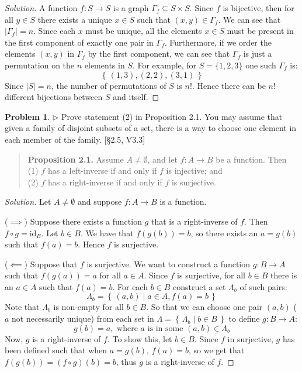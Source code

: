 \documentclass[fontsize=14pt]{scrartcl}
\theoremstyle{definition}
\newtheorem{problem-internal}{Problem}[subsection]
\newenvironment{problem}{
  \medskip
  \begin{problem-internal}
}{
  \end{problem-internal}
}
\newenvironment{solution}{
  \begin{proof}[Solution]
  \vspace{-8px}
  \setlength{\parskip}{4px}
  \setlength{\parindent}{0px}
}{
  \end{proof}
}
\newcommand{\set}[1]{\left\{\,#1\,\right\}}
\newcommand{\id}{\mathrm{id}}
\newcommand{\abs}[1]{\left|#1\right|}
\begin{document}
\begin{solution}
A function $f:S\to S$ is a graph $\Gamma_f\subseteq S\times S$. Since $f$ is
bijective, then for all $y\in S$ there exists a unique $x\in S$ such that
$(x,y)\in\Gamma_f$. We can see that $\abs{\Gamma_f} = n$. Since each $x$ must be
unique, all the elements $x\in S$ must be present in the first component of
exactly one pair in $\Gamma_f$. Furthermore, if we order the elements $(x,y)$ in
$\Gamma_f$ by the first component, we can see that $\Gamma_f$ is just a
permutation on the $n$ elements in $S$. For example, for $S=\{1,2,3\}$ one such
$\Gamma_f$ is:
%
\[ \set{ (1,3), (2,2), (3,1) } \]
%
Since $\abs{S} = n$, the number of permutations of $S$ is $n!$. Hence there can be
$n!$ different bijections between $S$ and itself.
\end{solution}


\begin{problem}
$\rhd$ Prove statement (2) in Proposition 2.1. You may assume that given a
family of disjoint subsets of a set, there is a way to choose one element in
each member of the family. [\S2.5, V3.3]

\begin{quote} \textbf{Proposition 2.1.} Assume $A\neq\emptyset$, and let $f:A\to
B$ be a function. Then
(1) $f$ has a left-inverse if and only if $f$ is injective; and \\
(2) $f$ has a right-inverse if and only if $f$ is surjective.
\end{quote}
\end{problem}

\begin{solution}
Let $A\neq\emptyset$ and suppose $f:A\to B$ is a function.

($\implies$) Suppose there exists a function $g$ that is a right-inverse of $f$.
Then $f\circ g = \id_B$. Let $b\in B$. We have that $f(g(b)) = b$, so there
exists an $a = g(b)$ such that $f(a) = b$. Hence $f$ is surjective.

($\impliedby$) Suppose that $f$ is surjective. We want to construct a function
$g:B\to A$ such that $f(g(a)) = a$ for all $a\in A$. Since $f$ is surjective,
for all $b\in B$ there is an $a\in A$ such that $f(a) = b$. For each $b\in B$
construct a set $\Lambda_b$ of such pairs:
%
\[ \Lambda_b = \set{ (a,b) \mid a \in A, f(a) = b } \]
%
Note that $\Lambda_b$ is non-empty for all $b\in B$. So that we can choose one
pair $(a,b)$ ($a$ not necessarily unique) from each set in $\Lambda =
\set{\Lambda_b\mid b\in B}$ to define $g:B\to A$:
%
\[ g(b) = a, \text{ where $a$ is in some $(a,b)\in\Lambda_b$} \]
%
Now, $g$ is a right-inverse of $f$. To show this, let $b\in B$. Since $f$ in
surjective, $g$ has been defined such that when $a=g(b)$, $f(a)=b$, so we get
that $f(g(b)) = (f\circ g)(b) = b$, thus $g$ is a right-inverse of $f$.
\end{solution}
\end{document}
